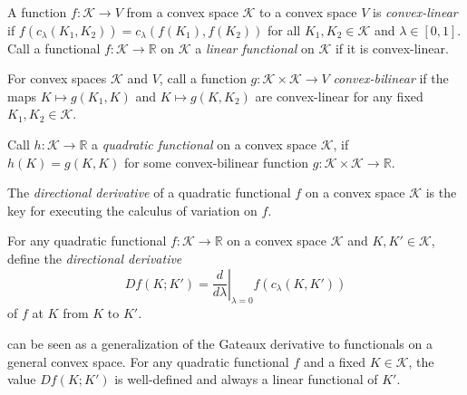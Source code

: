 \begin{definition}

A function \(f : \mathcal{K} \to V\) from a convex space \(\mathcal{K}\) to a convex space \(V\) is \emph{convex-linear} if \(f(c_\lambda(K_1, K_2)) = c_\lambda(f(K_1), f(K_2))\) for all \(K_1, K_2 \in \mathcal{K}\) and \(\lambda \in [0, 1]\). Call a functional \(f : \mathcal{K} \to \mathbb{R}\) on \(\mathcal{K}\) a \emph{linear functional} on \(\mathcal{K}\) if it is convex-linear.

\label{def:convex-linear}
\end{definition}

\begin{definition}

For convex spaces \(\mathcal{K}\) and \(V\), call a function \(g : \mathcal{K} \times \mathcal{K} \to V\) \emph{convex-bilinear} if the maps \(K \mapsto g(K_1, K)\) and \(K \mapsto g(K, K_2)\) are convex-linear for any fixed \(K_1, K_2 \in \mathcal{K}\).

\label{def:convex-bilinear}
\end{definition}

\begin{definition}

Call \(h : \mathcal{K} \to \mathbb{R}\) a \emph{quadratic functional} on a convex space \(\mathcal{K}\), if \(h(K) = g(K, K)\) for some convex-bilinear function \(g : \mathcal{K} \times \mathcal{K} \to \mathbb{R}\).

\label{def:convex-space-quadratic}
\end{definition}

The \emph{directional derivative} of a quadratic functional \(f\) on a convex space \(\mathcal{K}\) is the key for executing the calculus of variation on \(f\).

\begin{definition}

For any quadratic functional \(f : \mathcal{K} \to \mathbb{R}\) on a convex space \(\mathcal{K}\) and \(K, K' \in \mathcal{K}\), define the \emph{directional derivative}
\[
Df(K; K') = \left. \frac{d}{d \lambda} \right|_{\lambda = 0} f(c_\lambda(K, K'))
\]
of \(f\) at \(K\) from \(K\) to \(K'\).

\label{def:convex-space-directional-derivative}
\end{definition}

 can be seen as a generalization of the Gateaux derivative to functionals on a general convex space. For any quadratic functional \(f\) and a fixed \(K \in \mathcal{K}\), the value \(Df(K; K')\) is well-defined and always a linear functional of \(K'\).

